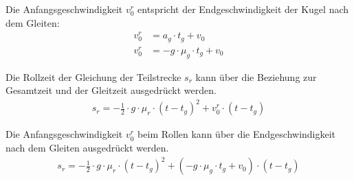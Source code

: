 Die Anfangsgeschwindigkeit $v^r_0$ entspricht der Endgeschwindigkeit der Kugel nach dem Gleiten:
\begin{align}
    v^r_0 &= a_g \cdot t_g + v_0\\
    v^r_0 &= - g \cdot \mu_g \cdot t_g + v_0
\end{align}

Die Rollzeit der Gleichung der Teilstrecke $s_r$ kann über die Beziehung zur Gesamtzeit und der Gleitzeit ausgedrückt werden.
\begin{align}
    s_r = - \frac{1}{2} \cdot g \cdot \mu_r \cdot (t - t_g)^2 + v^r_0 \cdot (t - t_g)
\end{align}

Die Anfangsgeschwindigkeit $v^r_0$ beim Rollen kann über die Endgeschwindigkeit nach dem Gleiten ausgedrückt werden.
\begin{align}
    s_r = - \frac{1}{2} \cdot g \cdot \mu_r \cdot (t - t_g)^2 + (-g \cdot \mu_g \cdot t_g + v_0) \cdot (t - t_g)
\end{align}

